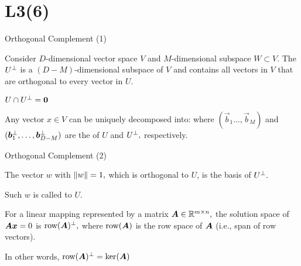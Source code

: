 \documentclass[handout,fleqn,aspectratio=169]{beamer}
\begin{document}
\section{L3(6)}
\begin{frame}{Orthogonal Complement (1)}

\plitemsep 0.1in

\bci 

\item Consider $D$-dimensional vector space $V$ and $M$-dimensional subspace  $W \subset V.$ The  $U^{\bot}$ is a $(D-M)$-dimensional subspace of $V$ and contains all vectors in $V$ that are orthogonal to every vector in $U.$

\item $U \cap U^{\bot} = \bm{0}$

\item Any vector $x \in V$ can be uniquely decomposed into:
where $(\vec{b}_1 \ldots, \vec{b}_M)$ and $(\bm{b}^{\bot}_1, \ldots, \bm{b}^{\bot}_{D-M} )$ are the  of $U$ and $U^{\bot},$ respectively. 
\eci
\end{frame}

\begin{frame}{Orthogonal Complement (2)}

\plitemsep 0.1in

\vspace{-0.3cm}
\begin{center}
\end{center}
\vspace{-0.5cm}
\bci 
\item The vector $w$ with $\left \lVert w \right \rVert=1,$ which is orthogonal to $U$, is the basis of $U^{\bot}.$
\item Such $w$ is called  to $U.$

\item For a linear mapping represented by a matrix $\bm{A} \in {\mathbb R}^{m \times n},$ the solution space of $\bm{A} \bm{x} =0$ is $\text{row}(\bm{A})^{\bot},$ where $\text{row}(\bm{A})$ is the row space of $\bm{A}$ (i.e., span of row vectors).

In other words, $\text{row}(\bm{A})^{\bot} = \ker(\bm{A})$
\eci


\end{frame}
\end{document}
